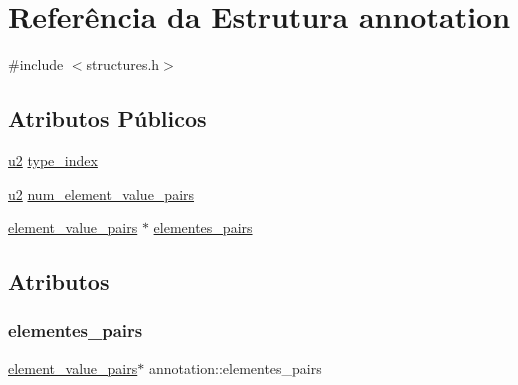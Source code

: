 \hypertarget{structannotation}{}\section{Referência da Estrutura annotation}
\label{structannotation}


{\ttfamily \#include $<$structures.\+h$>$}

\subsection*{Atributos Públicos}
\begin{DoxyCompactItemize}
\item 
\hyperlink{lista__operandos_8h_a732cde1300aafb73b0ea6c2558a7a54f}{u2} \hyperlink{structannotation_ac1579f92b65639fa8646311a2520e58c}{type\+\_\+index}
\item 
\hyperlink{lista__operandos_8h_a732cde1300aafb73b0ea6c2558a7a54f}{u2} \hyperlink{structannotation_a5f584027263eca714f8ee8fc02fcc2ac}{num\+\_\+element\+\_\+value\+\_\+pairs}
\item 
\hyperlink{structelement__value__pairs}{element\+\_\+value\+\_\+pairs} $\ast$ \hyperlink{structannotation_a4b33f66e2657ea077cec0392e82a0ce5}{elementes\+\_\+pairs}
\end{DoxyCompactItemize}


\subsection{Atributos}
\mbox{\label{structannotation_a4b33f66e2657ea077cec0392e82a0ce5}} 
\subsubsection{\texorpdfstring{elementes\+\_\+pairs}{elementes\_pairs}}
{\footnotesize\ttfamily \hyperlink{structelement__value__pairs}{element\+\_\+value\+\_\+pairs}$\ast$ annotation\+::elementes\+\_\+pairs}

\mbox{\label{structannotation_a5f584027263eca714f8ee8fc02fcc2ac}} 
